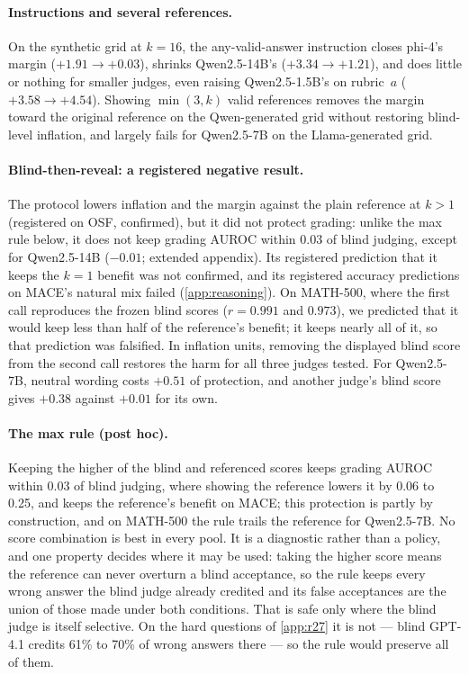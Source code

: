 \paragraph{Instructions and several references.}
On the synthetic grid at $k{=}16$, the any-valid-answer instruction closes phi-4's margin ($+1.91 \to +0.03$), shrinks Qwen2.5-14B's ($+3.34 \to +1.21$), and does little or nothing for smaller judges, even raising Qwen2.5-1.5B's on rubric~$a$ ($+3.58 \to +4.54$). Showing $\min(3,k)$ valid references removes the margin toward the original reference on the Qwen-generated grid without restoring blind-level inflation, and largely fails for Qwen2.5-7B on the Llama-generated grid.

\paragraph{Blind-then-reveal: a registered negative result.}
The protocol lowers inflation and the margin against the plain reference at $k{>}1$ (registered on OSF, confirmed), but it did not protect grading: unlike the max rule below, it does not keep grading AUROC within 0.03 of blind judging, except for Qwen2.5-14B ($-0.01$; extended appendix).\ph{} Its registered prediction that it keeps the $k{=}1$ benefit was not confirmed, and its registered accuracy predictions on \textsc{MACE}'s natural mix failed (\cref{app:reasoning}). On MATH-500, where the first call reproduces the frozen blind scores ($r=0.991$ and $0.973$), we predicted that it would keep less than half of the reference's benefit; it keeps nearly all of it, so that prediction was falsified. In inflation units, removing the displayed blind score from the second call restores the harm for all three judges tested. For Qwen2.5-7B, neutral wording costs $+0.51$  of protection, and another judge's blind score gives $+0.38$ against $+0.01$ for its own.\pre

\paragraph{The max rule (post hoc).}
Keeping the higher of the blind and referenced scores keeps grading AUROC within 0.03 of blind judging, where showing the reference lowers it by 0.06 to 0.25, and keeps the reference's benefit on \textsc{MACE}; this protection is partly by construction, and on MATH-500 the rule trails the reference for Qwen2.5-7B.\ph{} No score combination is best in every pool. It is a diagnostic rather than a policy, and one property decides where it may be used: taking the higher score means the reference can never overturn a blind acceptance, so the rule keeps every wrong answer the blind judge already credited and its false acceptances are the union of those made under both conditions. That is safe only where the blind judge is itself selective. On the hard questions of \cref{app:r27} it is not --- blind GPT-4.1 credits 61\% to 70\% of wrong answers there --- so the rule would preserve all of them.

